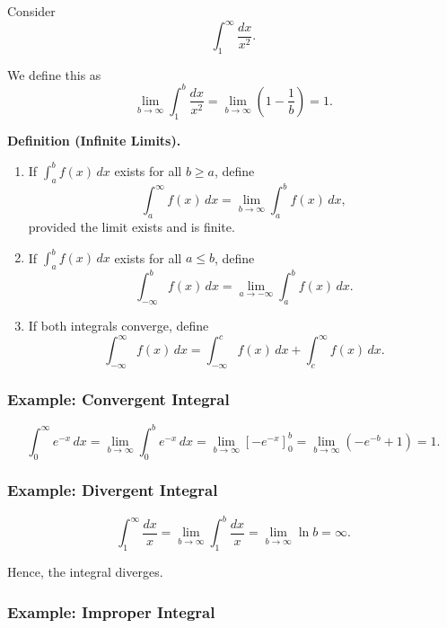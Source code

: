 Consider
\[
\int_1^\infty \frac{dx}{x^2}.
\]

We define this as
\[
\lim_{b\to\infty} \int_1^b \frac{dx}{x^2}
= \lim_{b\to\infty} \left(1 - \frac{1}{b}\right)
= 1.
\]

\medskip

\textbf{Definition (Infinite Limits).}

\begin{enumerate}
\item If $\int_a^b f(x)\,dx$ exists for all $b \ge a$, define
\[
\int_a^\infty f(x)\,dx = \lim_{b\to\infty} \int_a^b f(x)\,dx,
\]
provided the limit exists and is finite.

\item If $\int_a^b f(x)\,dx$ exists for all $a \le b$, define
\[
\int_{-\infty}^b f(x)\,dx = \lim_{a\to -\infty} \int_a^b f(x)\,dx.
\]

\item If both integrals converge, define
\[
\int_{-\infty}^\infty f(x)\,dx
= \int_{-\infty}^c f(x)\,dx + \int_c^\infty f(x)\,dx.
\]
\end{enumerate}

\subsubsection{Example: Convergent Integral}
\label{sss:exam-1179}

\[
\int_0^\infty e^{-x}\,dx
= \lim_{b\to\infty} \int_0^b e^{-x}\,dx
= \lim_{b\to\infty} \left[-e^{-x}\right]_0^b
= \lim_{b\to\infty} (-e^{-b} + 1)
= 1.
\]

\subsubsection{Example: Divergent Integral}
\label{sss:exam-7826}

\[
\int_1^\infty \frac{dx}{x}
= \lim_{b\to\infty} \int_1^b \frac{dx}{x}
= \lim_{b\to\infty} \ln b
= \infty.
\]

Hence, the integral diverges.

\subsubsection{Example: Improper Integral}
\label{sss:exam-d573}

